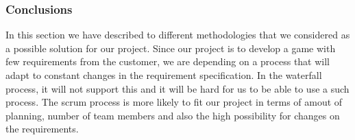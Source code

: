 \subsubsection{Conclusions}
In this section we have described to different methodologies that we considered as a possible solution 
for our project. Since our project is to develop a game with few requirements from the customer, we are
depending on a process that will adapt to constant changes in the requirement specification. 
In the waterfall process, it will not support this and it will be hard for us to be able to use a
such process. The scrum process is more likely to fit our project in terms of amout of planning, 
number of team members and also the high possibility for changes on the requirements.


